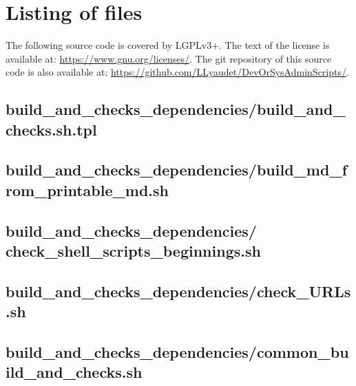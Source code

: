 \documentclass{article}
\begin{document}
\section{Listing of files}
\label{section:listing}

The following source code is covered by LGPLv3+.
The text of the license is available at:
\url{https://www.gnu.org/licenses/}.
The git repository of this source code is also available at:
\url{https://github.com/LLyaudet/DevOrSysAdminScripts/}.


\subsection{
  build\_and\_checks\_dependencies/build\_and\_checks.sh.tpl
}
\label{
  build_and_checks_dependencies:build_and_checksshtpl
}



\subsection{
  build\_and\_checks\_dependencies/build\_md\_from\_printable\_md.sh
}
\label{
  build_and_checks_dependencies:build_md_from_printable_mdsh
}



\subsection{
  build\_and\_checks\_dependencies/%
check\_shell\_scripts\_beginnings.sh
}
\label{
  build_and_checks_dependencies:check_shell_scripts_beginningssh
}



\subsection{
  build\_and\_checks\_dependencies/check\_URLs.sh
}
\label{
  build_and_checks_dependencies:check_URLssh
}



\subsection{
  build\_and\_checks\_dependencies/common\_build\_and\_checks.sh
}
\label{
  build_and_checks_dependencies:common_build_and_checkssh
}
\end{document}
